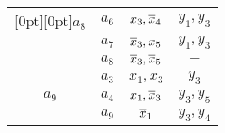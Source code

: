 \begin{table*}
\begin{center}
\begin{minipage}[t]{190pt}
\begin{tabular}{|c|c|c|c|}
\multicolumn{1}{|c|}{\raisebox{-6pt}[0pt][0pt]{$a_8$}} & $a_6$ & $x_3,\overline x_4$ & $y_1,y_3$ \\
 & $a_7$ & $\overline x_3,x_5$ & $y_1,y_3$ \\
 & $a_8$ & $\overline x_3,\overline x_5$ & $-$ \\
\hline
  & $a_3$ & $x_1,x_3$ & $y_3$ \\
 $a_9$& $a_4$ & $x_1,\overline x_3$ & $y_3,y_5$ \\
 & $a_9$ & $\overline x_1$ & $y_3,y_4$ \\
\hline
\end{tabular}
\end{minipage}
\end{center}
\end{table*}



